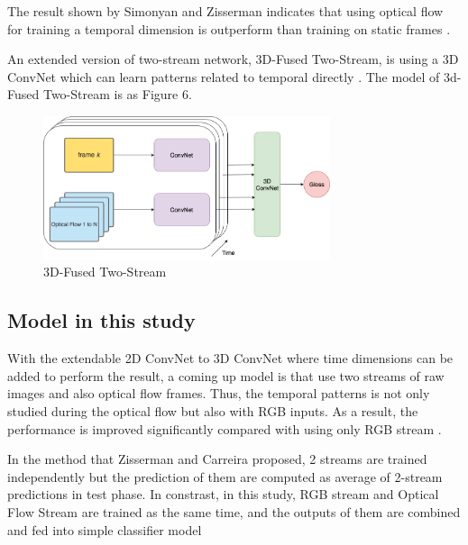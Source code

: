 \documentclass[a4paper, 12pt]{article}
\begin{document}
The result shown by Simonyan and Zisserman indicates that using optical flow for training a temporal dimension is outperform than training on static frames \citep{karpathy2014large}.

An extended version of two-stream network, 3D-Fused Two-Stream, is using a 3D ConvNet which can learn patterns related to temporal directly \citep{carreira2017quo}. The model of 3d-Fused Two-Stream is as Figure 6.

\begin{figure}[hbt!]
    \centering
    \includegraphics[width=0.75\textwidth]{3D-Fused Two-stream.png}
    \caption{3D-Fused Two-Stream}
    \label{Figure 6}
\end{figure}

\subsection{Model in this study}
With the extendable 2D ConvNet to 3D ConvNet where time dimensions can be added to perform the result, a coming up model is that use two streams of raw images and also optical flow frames. Thus, the temporal patterns is not only studied during the optical flow but also with RGB inputs. As a result, the performance is improved significantly compared with using only RGB stream \citep{carreira2017quo}.

In the method that Zisserman and Carreira proposed, 2 streams are trained independently but the prediction of them are computed as average of 2-stream predictions in test phase. In constrast, in this study, RGB stream and Optical Flow Stream are trained as the same time, and the outputs of them are combined and fed into simple classifier model
\end{document}
